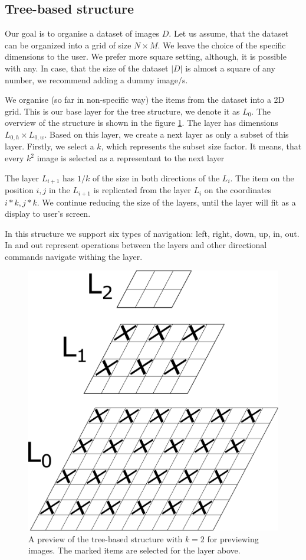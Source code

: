 \subsection{Tree-based structure}

Our goal is to organise a dataset of images $D$. Let us assume, that the dataset can be organized into a grid of size $N\times M$. We leave the choice of the specific dimensions to the user. We prefer more square setting, although, it is possible with any. In case, that the size of the dataset $|D|$ is almost a square of any number, we recommend adding a dummy image/s.

We organise (so far in non-specific way) the items from the dataset into a 2D grid. This is our base layer for the tree structure, we denote it as $L_0$. The overview of the structure is shown in the figure \ref{fig:tree_structure}. The layer has dimensions $L_{0, h}\times L_{0, w}$. Based on this layer, we create a next layer as only a subset of this layer. Firstly, we select a $k$, which represents the subset size factor. It means, that every $k^2$ image is selected as a representant to the next layer

The layer $L_{i+1}$ has $1/k$ of the size in both directions of the $L_i$. The item on the position $i, j$ in the $L_{i+1}$ is replicated from the layer $L_i$ on the coordinates $i * k, j*k$. We continue reducing the size of the layers, until the layer will fit as a display to user's screen.

In this structure we support six types of navigation: left, right, down, up, in, out. In and out represent operations between the layers and other directional commands navigate withing the layer. 


\begin{figure}
    \centering
    \includegraphics[width=0.3\linewidth]{img/tree-structure.pdf}
    \caption{A preview of the tree-based structure with $k = 2$ for previewing images. The marked items are selected for the layer above.}
    \label{fig:tree_structure}
\end{figure}

